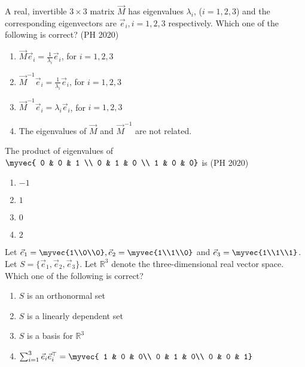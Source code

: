     \item A real, invertible $3 \times 3$ matrix $\vec{M}$ has eigenvalues $\lambda_i$, ($i=1,2,3$) and the corresponding eigenvectors are $\vec{e}_i, i=1,2,3$ respectively. Which one of the following is correct? \hfill (PH 2020)
    \begin{enumerate}
        \item $\vec{M} \vec{e}_i = \frac{1}{\lambda_i} \vec{e}_i$, for $i = 1,2,3$
        \item $\vec{M}^{-1} \vec{e}_i = \frac{1}{\lambda_i} \vec{e}_i$, for $i = 1,2,3$
        \item $\vec{M}^{-1}\vec{e}_i = \lambda_i \vec{e}_i$, for $i = 1,2,3$
        \item The eigenvalues of $\vec{M}$ and $\vec{M}^{-1}$ are not related.
    \end{enumerate}
    \item The product of eigenvalues of
    $
        \myvec{
            0 & 0 & 1 \\
            0 & 1 & 0 \\
            1 & 0 & 0}
    $
    is
\hfill	    (PH 2020)
\begin{multicols}{4}
    \begin{enumerate}
        \item $-1$
        \item $1$
        \item $0$
        \item $2$
    \end{enumerate}
\end{multicols}
    \item Let $\vec{e}_1 = \myvec{1\\0\\0}, \vec{e}_2 = \myvec{1\\1\\0}$ and $\vec{e}_3 = \myvec{1\\1\\1}$. Let $S = \{\vec{e}_1, \vec{e}_2, \vec{e}_3\}$. Let $\mathbb{R}^3$ denote the three-dimensional real vector space. Which one of the following is correct?
    \begin{enumerate}
        \item $S$ is an orthonormal set
        \item $S$ is a linearly dependent set
        \item $S$ is a basis for $\mathbb{R}^3$
	\item $\sum_{i=1}^3\vec{e}_i \vec{e}_i^{\top}=
        \myvec{
            1 & 0 & 0\\
            0 & 1 & 0\\
            0 & 0 & 1}
        $
    \end{enumerate}
